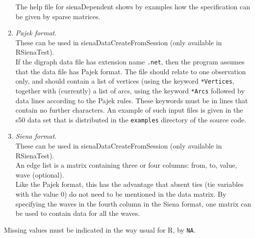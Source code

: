 \documentclass[a4paper,fleqn,11pt]{article}
\newcommand{\+}{\, + \,}
\newcommand{\sfn}[1]{\textsf{#1}}
\newcommand{\Rn}{{\sf R}}
\newcommand{\rst}{{\sf RSienaTest}}
\begin{document}
\begin{enumerate}
      The help file for \textsf{sienaDependent} shows by examples how the
      specification can be given by sparse matrices.
    \item \emph{Pajek format}.\\
      These can be used in \sfn{sienaDataCreateFromSession}
      (only available in \rst).\\
      If the digraph data file has extension name \texttt{.net}, then the
      program assumes that the data file has Pajek format.
      The file should relate to one observation only,
      and should contain a list of vertices (using the
      keyword \texttt{*Vertices}, together with (currently) a list of arcs,
      using the keyword \texttt{*Arcs}
      followed by data lines according to the Pajek rules.
      These keywords must be in lines that contain no further characters.
      An example of such input files is given in the s50 data set
      that is distributed in the \texttt{examples} directory of the
      source code.
    \item \emph{Siena format}.\\
      These can be used in \sfn{sienaDataCreateFromSession} (only available in \rst).\\
      An edge list is a matrix containing three or four columns:
      from, to, value, wave (optional).\\
      Like the Pajek format, this has the advantage that absent ties (tie
      variables with the value 0) do not need to be mentioned in the data
      matrix. By specifying the waves in the fourth column in the
      \sfn{Siena} format, one matrix can be used to contain data for all
      the waves.

\end{enumerate}

Missing values must be indicated in the way usual for \Rn,
by \texttt{NA}.

\end{document}
